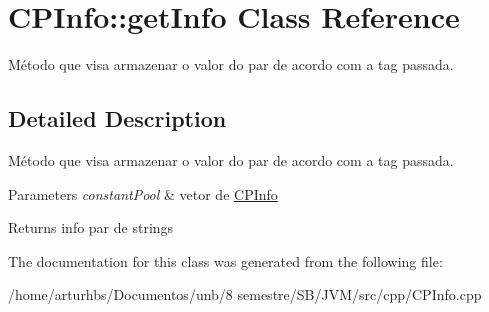 \hypertarget{classCPInfo_1_1getInfo}{}\section{C\+P\+Info\+:\+:get\+Info Class Reference}
\label{classCPInfo_1_1getInfo}


Método que visa armazenar o valor do par de acordo com a tag passada.  




\subsection{Detailed Description}
Método que visa armazenar o valor do par de acordo com a tag passada. 


\begin{DoxyParams}{Parameters}
{\em constant\+Pool} & vetor de \hyperlink{classCPInfo}{C\+P\+Info} \\
\hline
\end{DoxyParams}
\begin{DoxyReturn}{Returns}
info par de strings 
\end{DoxyReturn}


The documentation for this class was generated from the following file\+:\begin{DoxyCompactItemize}
\item 
/home/arturhbs/\+Documentos/unb/8 semestre/\+S\+B/\+J\+V\+M/src/cpp/C\+P\+Info.\+cpp\end{DoxyCompactItemize}
